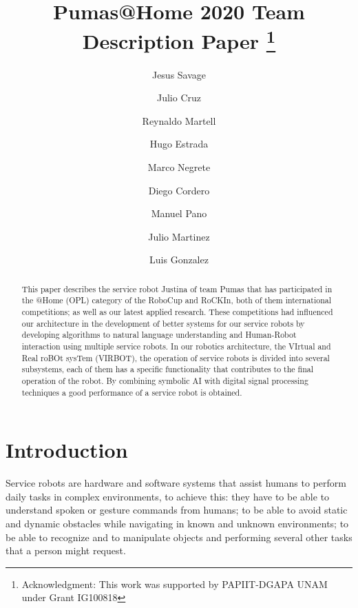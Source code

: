 \documentclass{llncs}
\begin{document}
\title{Pumas@Home 2020 Team Description Paper
\thanks{Acknowledgment: This work was supported by PAPIIT-DGAPA UNAM under Grant IG100818}}
\author{
	Jesus Savage 
	\and Julio Cruz 
	\and Reynaldo Martell 
	\and Hugo Estrada 
	\and Marco Negrete 
	\and Diego Cordero
	\and Manuel Pano
	\and Julio Martinez
	\and Luis Gonzalez
}
\maketitle


\begin{abstract}

This paper describes the service robot Justina of team Pumas that has participated in the @Home (OPL) category of the RoboCup and RoCKIn, both of them international competitions; as well as our latest applied research. These competitions had influenced our architecture in the development of better systems for our service robots by developing algorithms to natural language understanding and Human-Robot interaction using multiple service robots.
In our robotics architecture, the VIrtual and Real roBOt sysTem (VIRBOT), the operation of service robots is divided into several subsystems, each of them has a specific functionality  that contributes to the final operation of the robot.
By combining symbolic AI with digital signal processing techniques a good performance of a service robot is obtained.

\end{abstract}


\section{Introduction}

Service robots are hardware and software systems that assist humans to perform daily tasks in complex environments, to achieve this: they have to be able to understand spoken or gesture commands from humans; to be able to avoid static and dynamic obstacles while navigating in known and unknown environments; to be able to recognize and to manipulate objects and performing several other tasks that a person might request. 
\end{document}
